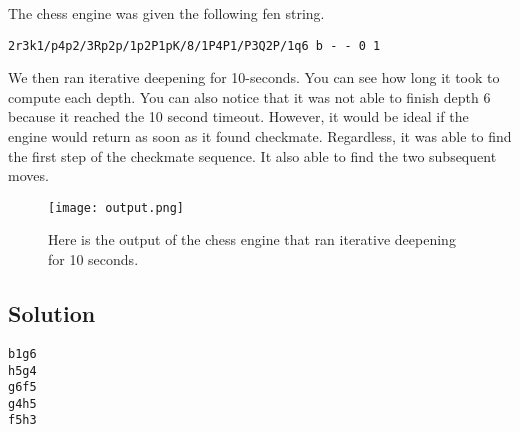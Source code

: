 \documentclass[sigconf]{acmart}
\begin{document}
The chess engine was given the following fen string.
\begin{verbatim}
2r3k1/p4p2/3Rp2p/1p2P1pK/8/1P4P1/P3Q2P/1q6 b - - 0 1
\end{verbatim}
We then ran iterative deepening for 10-seconds.
You can see how long it took to compute each depth. 
You can also notice that it was not able to finish depth 6 because it reached the 10 second timeout.
However, it would be ideal if the engine would return as soon as it found checkmate.
Regardless, it was able to find the first step of the checkmate sequence.
It also able to find the two subsequent moves.

\begin{figure}[H]
    \centering
    \texttt{[image: output.png]}
    \caption{Here is the output of the chess engine that ran iterative deepening for 10 seconds.}
    \label{fig:enter-label}
\end{figure}

\subsection{Solution}
\begin{verbatim}
b1g6
h5g4
g6f5
g4h5
f5h3
\end{verbatim}
\end{document}
